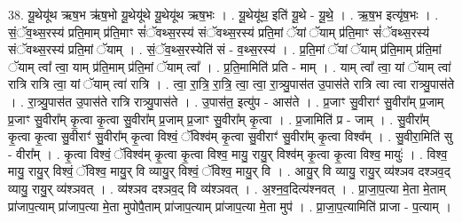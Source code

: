 \documentclass[17pt]{extarticle}
\begin{document}
38. यू॒थेयू॑थ ऋष॒भ ऋ॑ष॒भो यू॒थेयू॑थे यू॒थेयू॑थ ऋष॒भः । . यू॒थेयू॑थ॒ इति॑ यू॒थे - यू॒थे॒ । . ऋ॒ष॒भ इत्यृ॑ष॒भः । . सं॒ॅव॒थ्स॒रस्य॑ प्रति॒माम् प्र॑ति॒माꣳ सं॑ॅवथ्स॒रस्य॑ संॅवथ्स॒रस्य॑ प्रति॒मां ॅयां ॅयाम् प्र॑ति॒माꣳ सं॑ॅवथ्स॒रस्य॑ संॅवथ्स॒रस्य॑ प्रति॒मां ॅयाम् । . सं॒ॅव॒थ्स॒रस्येति॑ सं - व॒थ्स॒रस्य॑ । . प्र॒ति॒मां ॅयां ॅयाम् प्र॑ति॒माम् प्र॑ति॒मां ॅयाम् त्वा᳚ त्वा॒ याम् प्र॑ति॒माम् प्र॑ति॒मां ॅयाम् त्वा᳚ । . प्र॒ति॒मामिति॑ प्रति - माम् । . याम् त्वा᳚ त्वा॒ यां ॅयाम् त्वा॑ रात्रि रात्रि त्वा॒ यां ॅयाम् त्वा॑ रात्रि । . त्वा॒ रा॒त्रि॒ रा॒त्रि॒ त्वा॒ त्वा॒ रा॒त्र्यु॒पास॑त उ॒पास॑ते रात्रि त्वा त्वा रात्र्यु॒पास॑ते । . रा॒त्र्यु॒पास॑त उ॒पास॑ते रात्रि रात्र्यु॒पास॑ते । . उ॒पास॑त॒ इत्यु॑प - आस॑ते । . प्र॒जाꣳ सु॒वीराꣳ॑ सु॒वीरा᳚म् प्र॒जाम् प्र॒जाꣳ सु॒वीरा᳚म् कृ॒त्वा कृ॒त्वा सु॒वीरा᳚म् प्र॒जाम् प्र॒जाꣳ सु॒वीरा᳚म् कृ॒त्वा । . प्र॒जामिति॑ प्र - जाम् । . सु॒वीरा᳚म् कृ॒त्वा कृ॒त्वा सु॒वीराꣳ॑ सु॒वीरा᳚म् कृ॒त्वा विश्वं॒ ॅविश्व॑म् कृ॒त्वा सु॒वीराꣳ॑ सु॒वीरा᳚म् कृ॒त्वा विश्व᳚म् । . सु॒वीरा॒मिति॑ सु - वीरा᳚म् । . कृ॒त्वा विश्वं॒ ॅविश्व॑म् कृ॒त्वा कृ॒त्वा विश्व॒ मायु॒ रायु॒र् विश्व॑म् कृ॒त्वा कृ॒त्वा विश्व॒ मायुः॑ । . विश्व॒ मायु॒ रायु॒र् विश्वं॒ ॅविश्व॒ मायु॒र् वि व्यायु॒र् विश्वं॒ ॅविश्व॒ मायु॒र् वि । . आयु॒र् वि व्यायु॒ रायु॒र् व्य॑श्ञव दश्ञव॒द् व्यायु॒ रायु॒र् व्य॑श्ञवत् । . व्य॑श्ञव दश्ञव॒द् वि व्य॑श्ञवत् । . अ॒श्न॒व॒दित्य॑श्नवत् । . प्रा॒जा॒प॒त्या मे॒ता मे॒ताम् प्रा॑जाप॒त्याम् प्रा॑जाप॒त्या मे॒ता मुपोपै॒ताम् प्रा॑जाप॒त्याम् प्रा॑जाप॒त्या मे॒ता मुप॑ । . प्रा॒जा॒प॒त्यामिति॑ प्राजा - प॒त्याम् । \newline
\pagebreak
{}
\end{document}
